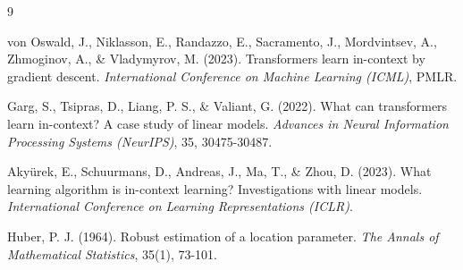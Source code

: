 \documentclass[12pt,a4paper]{article}
\begin{document}
\vspace{1cm}

\renewcommand{\refname}{Список литературы}
\begin{thebibliography}{9}
	
	von Oswald, J., Niklasson, E., Randazzo, E., Sacramento, J., Mordvintsev, A., Zhmoginov, A., \& Vladymyrov, M. (2023). Transformers learn in-context by gradient descent. \textit{International Conference on Machine Learning (ICML)}, PMLR.
	
	Garg, S., Tsipras, D., Liang, P. S., \& Valiant, G. (2022). What can transformers learn in-context? A case study of linear models. \textit{Advances in Neural Information Processing Systems (NeurIPS)}, 35, 30475-30487.
	
	Akyürek, E., Schuurmans, D., Andreas, J., Ma, T., \& Zhou, D. (2023). What learning algorithm is in-context learning? Investigations with linear models. \textit{International Conference on Learning Representations (ICLR)}.
	
	Huber, P. J. (1964). Robust estimation of a location parameter. \textit{The Annals of Mathematical Statistics}, 35(1), 73-101.
	
\end{thebibliography}
\end{document}
